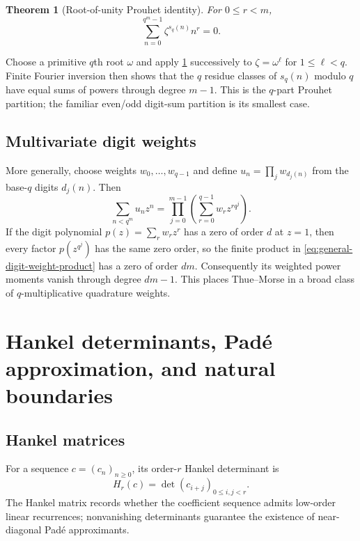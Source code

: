 \documentclass[11pt,oneside]{article}
\newtheorem{theorem}{Theorem}[section]
\theoremstyle{definition}
\theoremstyle{remark}
\begin{document}
\begin{theorem}[Root-of-unity Prouhet identity]\label{thm:baseq-prouhet}
For $0\le r<m$,
\begin{equation}\label{eq:baseq-prouhet}
 \sum_{n=0}^{q^m-1}\zeta^{s_q(n)}n^r=0.
\end{equation}
\end{theorem}

Choose a primitive $q$th root $\omega$ and apply
\cref{thm:baseq-prouhet} successively to $\zeta=\omega^\ell$ for
$1\le\ell<q$.  Finite Fourier inversion then shows that the $q$ residue
classes of $s_q(n)$ modulo $q$ have equal sums of powers through degree
$m-1$.  This is the $q$-part Prouhet partition; the familiar even/odd
digit-sum partition is its smallest case.

\subsection{Multivariate digit weights}

More generally, choose weights $w_0,\ldots,w_{q-1}$ and define
$u_n=\prod_jw_{d_j(n)}$ from the base-$q$ digits $d_j(n)$.  Then
\begin{equation}\label{eq:general-digit-weight-product}
 \sum_{n<q^m}u_nz^n
 =\prod_{j=0}^{m-1}
  \left(\sum_{r=0}^{q-1}w_rz^{rq^j}\right).
\end{equation}
If the digit polynomial $p(z)=\sum_rw_rz^r$ has a zero of order $d$ at
$z=1$, then every factor $p(z^{q^j})$ has the same zero order, so the finite
product in \cref{eq:general-digit-weight-product} has a zero of order $dm$.
Consequently its weighted power moments vanish through degree $dm-1$.  This
places Thue--Morse in a broad class of $q$-multiplicative quadrature weights.

\section{Hankel determinants, Pad\'e approximation, and natural boundaries}\label{sec:hankel}

\subsection{Hankel matrices}

For a sequence $c=(c_n)_{n\ge0}$, its order-$r$ Hankel determinant is
\begin{equation}\label{eq:hankel-def}
 H_r(c)=\det(c_{i+j})_{0\le i,j<r}.
\end{equation}
The Hankel matrix records whether the coefficient sequence admits low-order
linear recurrences; nonvanishing determinants guarantee the existence of
near-diagonal Pad\'e approximants.
\end{document}

